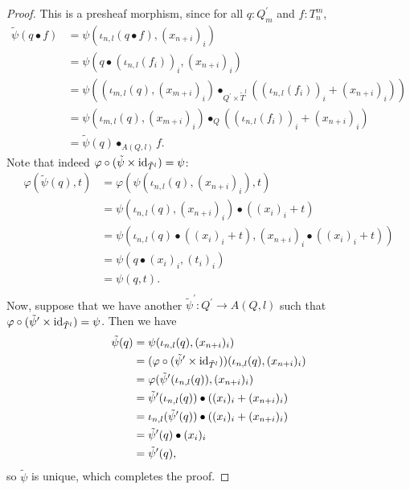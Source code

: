 \begin{proof}
  This is a presheaf morphism, since for all $ q: Q^\prime_m $ and $ f : T_n^m $,
  \begin{align*}
    \tilde \psi(q \bullet f) &= \psi(\iota_{n, l}(q \bullet f), (x_{n + i})_i)\\
    &= \psi(q \bullet (\iota_{n, l}(f_i))_i, (x_{n + i})_i)\\
    &= \psi((\iota_{m, l}(q), (x_{m + i})_i) \bullet_{Q^\prime \times \tilde T^l} ((\iota_{n, l}(f_i))_i + (x_{n + i})_i))\\
    &= \psi(\iota_{m, l}(q), (x_{m + i})_i) \bullet_Q ((\iota_{n, l}(f_i))_i + (x_{n + i})_i)\\
    &= \tilde \psi(q) \bullet_{A(Q, l)} f.
  \end{align*}
  Note that indeed $ \varphi \circ (\tilde \psi \times \text{id}_{\tilde T^l}) = \psi $:
  \begin{align*}
    \varphi(\tilde \psi(q), t) &= \varphi(\psi(\iota_{n, l}(q), (x_{n + i})_i), t)\\
    &= \psi(\iota_{n, l}(q), (x_{n + i})_i) \bullet ((x_i)_i + t)\\
    &= \psi(\iota_{n, l}(q) \bullet ((x_i)_i + t), (x_{n + i})_i \bullet ((x_i)_i + t))\\
    &= \psi(q \bullet (x_i)_i, (t_i)_i)\\
    &= \psi(q, t).\\
  \end{align*}
  Now, suppose that we have another $ \tilde \psi^\prime : Q^\prime \to A(Q, l) $ such that $ \varphi \circ (\tilde \psi^\prime \times \text{id}_{\tilde T^l}) = \psi $. Then we have
  \begin{align*}
    \tilde \psi(q) &= \psi(\iota_{n, l}(q), (x_{n + i})_i)\\
    &= (\varphi \circ (\tilde \psi^\prime \times \text{id}_{\tilde T^l}))(\iota_{n, l}(q), (x_{n + i})_i)\\
    &= \varphi(\tilde \psi^\prime(\iota_{n, l}(q)), (x_{n + i})_i)\\
    &= \tilde \psi^\prime(\iota_{n, l}(q)) \bullet ((x_i)_i + (x_{n + i})_i)\\
    &= \iota_{n, l}(\tilde \psi^\prime(q)) \bullet ((x_i)_i + (x_{n + i})_i)\\
    &= \tilde \psi^\prime(q) \bullet (x_i)_i\\
    &= \tilde \psi^\prime(q),
  \end{align*}
  so $ \tilde \psi $ is unique, which completes the proof.
\end{proof}

